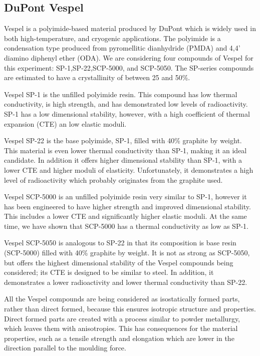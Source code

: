 \documentclass{report}
\begin{document}
\subsection{DuPont Vespel}
Vespel is a polyimide-based material produced by DuPont which is widely used in both high-temperature, and cryogenic applications. The polyimide is a condensation type produced from pyromellitic dianhydride (PMDA) and 4,4' diamino diphenyl ether (ODA)\footnotemark. We are considering four compounds of Vespel for this experiment: SP-1,SP-22,SCP-5000, and SCP-5050. The SP-series compounds are estimated to have a crystallinity of between 25 and 50\%.


Vespel SP-1 is the unfilled polyimide resin. This compound has low thermal conductivity, is high strength, and has demonstrated low levels of radioactivity. SP-1 has a low dimensional stability, however, with a high coefficient of thermal expansion (CTE) an low elastic moduli.

Vespel SP-22 is the base polyimide, SP-1, filled with 40\% graphite by weight. This material is even lower thermal conductivity than SP-1, making it an ideal candidate. In addition it offers higher dimensional stability than SP-1, with a lower CTE and higher moduli of elasticity. Unfortunately, it demonstrates a high level of radioactivity which probably originates from the graphite used.

Vespel SCP-5000 is an unfilled polyimide resin very similar to SP-1, however it has been engineered to have higher strength and improved dimensional stability. This includes a lower CTE and significantly higher elastic moduli. At the same time, we have shown that SCP-5000 has a thermal conductivity as low as SP-1.

Vespel SCP-5050 is analogous to SP-22 in that its composition is base resin (SCP-5000) filled with 40\% graphite by weight. It is not as strong as SCP-5050, but offers the highest dimensional stability of the Vespel compounds being considered; its CTE is designed to be similar to steel. In addition, it demonstrates a lower radioactivity and lower thermal conductivity than SP-22.

All the Vespel compounds are being considered as isostatically formed parts, rather than direct formed, because this ensures isotropic structure and properties. Direct formed parts are created with a process similar to powder metallurgy, which leaves them with anisotropies. This has consequences for the material properties, such as a tensile strength and elongation which are lower in the direction parallel to the moulding force.
\end{document}
